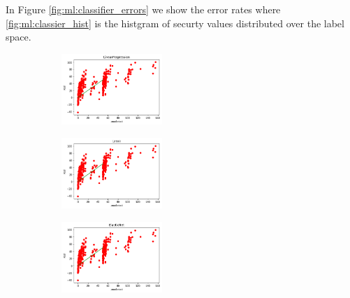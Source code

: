 


In Figure \ref{fig:ml:classifier_errors} we show the error rates where \ref{fig:ml:classier_hist} is the histgram of securty values distributed over the label space. 
    
    \graphicspath{{resource/img/ch_ml/results/}}
    \begin{figure}
        \centering
        \begin{subfigure}[t]{1.5in}        
            \includegraphics[width=1.5in]{output_34_1.png}     
            \caption{}
        \end{subfigure}
        \begin{subfigure}[t]{1.5in}
            
            \includegraphics[width=1.5in]{output_37_1.png}  
            \caption{}
        \end{subfigure}
        \begin{subfigure}[t]{1.5in}
            \includegraphics[width=1.5in]{output_41_1.png}
            \caption{}
        \end{subfigure}
         \begin{subfigure}[t]{1.5in}
                

\end{subfigure}
\end{figure}
